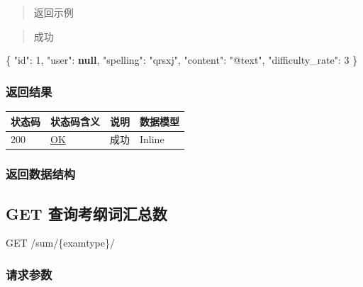 \documentclass[
]{article}
\newenvironment{Shaded}{}{}
\newcommand{\DataTypeTok}[1]{\textcolor[rgb]{0.56,0.13,0.00}{#1}}
\newcommand{\DecValTok}[1]{\textcolor[rgb]{0.25,0.63,0.44}{#1}}
\newcommand{\FunctionTok}[1]{\textcolor[rgb]{0.02,0.16,0.49}{#1}}
\newcommand{\KeywordTok}[1]{\textcolor[rgb]{0.00,0.44,0.13}{\textbf{#1}}}
\newcommand{\StringTok}[1]{\textcolor[rgb]{0.25,0.44,0.63}{#1}}
\begin{document}
\begin{quote}
返回示例
\end{quote}

\begin{quote}
成功
\end{quote}

\begin{Shaded}
\begin{Highlighting}[]
\FunctionTok{\{}
  \DataTypeTok{"id"}\FunctionTok{:} \DecValTok{1}\FunctionTok{,}
  \DataTypeTok{"user"}\FunctionTok{:} \KeywordTok{null}\FunctionTok{,}
  \DataTypeTok{"spelling"}\FunctionTok{:} \StringTok{"qrsxj"}\FunctionTok{,}
  \DataTypeTok{"content"}\FunctionTok{:} \StringTok{"@text"}\FunctionTok{,}
  \DataTypeTok{"difficulty\_rate"}\FunctionTok{:} \DecValTok{3}
\FunctionTok{\}}
\end{Highlighting}
\end{Shaded}

\hypertarget{ux8fd4ux56deux7ed3ux679c-6}{%
\subsubsection{返回结果}\label{ux8fd4ux56deux7ed3ux679c-6}}

\begin{longtable}[]{@{}llll@{}}
\toprule
状态码 & 状态码含义 & 说明 & 数据模型 \\
\midrule
\endhead
200 & \href{https://tools.ietf.org/html/rfc7231\#section-6.3.1}{OK} &
成功 & Inline \\
\bottomrule
\end{longtable}

\hypertarget{ux8fd4ux56deux6570ux636eux7ed3ux6784-6}{%
\subsubsection{返回数据结构}\label{ux8fd4ux56deux6570ux636eux7ed3ux6784-6}}

\hypertarget{get-ux67e5ux8be2ux8003ux7eb2ux8bcdux6c47ux603bux6570}{%
\subsection{GET
查询考纲词汇总数}\label{get-ux67e5ux8be2ux8003ux7eb2ux8bcdux6c47ux603bux6570}}

GET /sum/\{examtype\}/

\hypertarget{ux8bf7ux6c42ux53c2ux6570-7}{%
\subsubsection{请求参数}\label{ux8bf7ux6c42ux53c2ux6570-7}}
\end{document}
